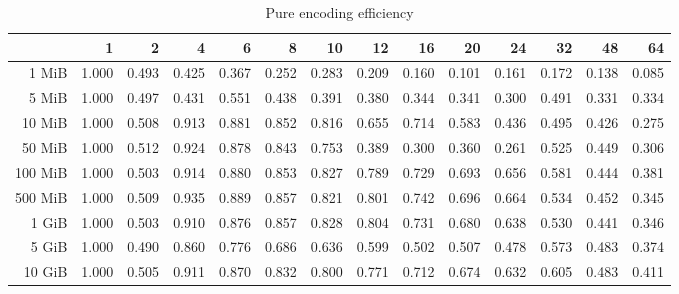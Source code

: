 \begin{table}[!h]
	\centering
	\caption{Pure encoding efficiency}
	\begin{tabular}{rrrrrrrrrrrrrr}
		\toprule
		\diagbox[width=7em]{Size}{Threads} &    1  &    2  &    4  &    6  &    8  &    10 &    12 &    16 &    20 &    24 &    32 &    48 &    64 \\
		\midrule
		1 MiB   & 1.000 & 0.493 & 0.425 & 0.367 & 0.252 & 0.283 & 0.209 & 0.160 & 0.101 & 0.161 & 0.172 & 0.138 & 0.085 \\
		5 MiB   & 1.000 & 0.497 & 0.431 & 0.551 & 0.438 & 0.391 & 0.380 & 0.344 & 0.341 & 0.300 & 0.491 & 0.331 & 0.334 \\
		10 MiB  & 1.000 & 0.508 & 0.913 & 0.881 & 0.852 & 0.816 & 0.655 & 0.714 & 0.583 & 0.436 & 0.495 & 0.426 & 0.275 \\
		50 MiB  & 1.000 & 0.512 & 0.924 & 0.878 & 0.843 & 0.753 & 0.389 & 0.300 & 0.360 & 0.261 & 0.525 & 0.449 & 0.306 \\
		100 MiB & 1.000 & 0.503 & 0.914 & 0.880 & 0.853 & 0.827 & 0.789 & 0.729 & 0.693 & 0.656 & 0.581 & 0.444 & 0.381 \\
		500 MiB & 1.000 & 0.509 & 0.935 & 0.889 & 0.857 & 0.821 & 0.801 & 0.742 & 0.696 & 0.664 & 0.534 & 0.452 & 0.345 \\
		1 GiB   & 1.000 & 0.503 & 0.910 & 0.876 & 0.857 & 0.828 & 0.804 & 0.731 & 0.680 & 0.638 & 0.530 & 0.441 & 0.346 \\
		5 GiB   & 1.000 & 0.490 & 0.860 & 0.776 & 0.686 & 0.636 & 0.599 & 0.502 & 0.507 & 0.478 & 0.573 & 0.483 & 0.374 \\
		10 GiB  & 1.000 & 0.505 & 0.911 & 0.870 & 0.832 & 0.800 & 0.771 & 0.712 & 0.674 & 0.632 & 0.605 & 0.483 & 0.411 \\
		\bottomrule
	\end{tabular}
\end{table}
